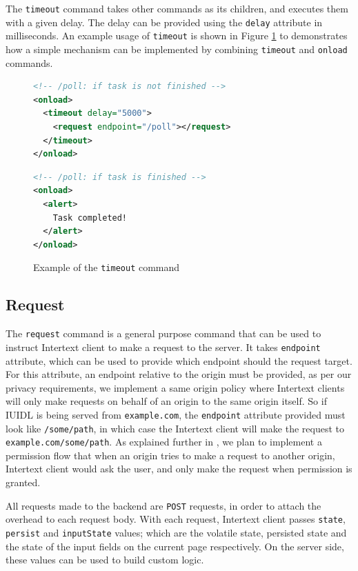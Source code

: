 The \texttt{timeout} command takes other commands as its children, and executes them with a given delay. The delay can be provided using the \texttt{delay} attribute in milliseconds. An example usage of \texttt{timeout} is shown in Figure \ref{fig:timeout_usage} to demonstrates how a simple  mechanism can be implemented by combining \texttt{timeout} and \texttt{onload} commands.

\begin{figure}
\begin{minipage}{\linewidth}
\begin{lstlisting}[language=xml]
<!-- /poll: if task is not finished -->
<onload>
  <timeout delay="5000">
    <request endpoint="/poll"></request>
  </timeout>
</onload>
\end{lstlisting}
\begin{lstlisting}[language=xml]
<!-- /poll: if task is finished -->
<onload>
  <alert>
    Task completed!
  </alert>
</onload>
\end{lstlisting}
\end{minipage}
\caption{Example of the \texttt{timeout} command}%
\label{fig:timeout_usage}%
\end{figure}

\subsection{Request}

The \texttt{request} command is a general purpose command that can be used to instruct Intertext client to make a request to the server. It takes \texttt{endpoint} attribute, which can be used to provide which endpoint should the request target. For this attribute, an endpoint relative to the origin must be provided, as per our privacy requirements, we implement a same origin policy where Intertext clients will only make requests on behalf of an origin to the same origin itself. So if IUIDL is being served from \texttt{example.com}, the \texttt{endpoint} attribute provided must look like \texttt{/some/path}, in which case the Intertext client will make the request to \texttt{example.com/some/path}. As explained further in , we plan to implement a permission flow that when an origin tries to make a request to another origin, Intertext client would ask the user, and only make the request when permission is granted.

All requests made to the backend are \texttt{POST} requests, in order to attach the overhead to each request body. With each request, Intertext client passes \texttt{state}, \texttt{persist} and \texttt{inputState} values; which are the volatile state, persisted state and the state of the input fields on the current page respectively. On the server side, these values can be used to build custom logic.

